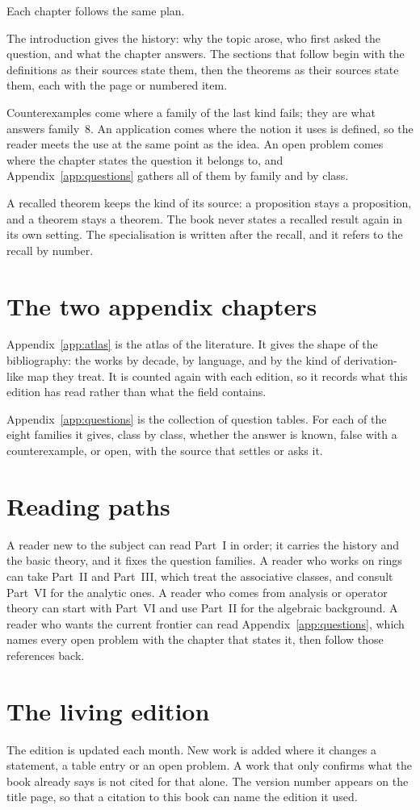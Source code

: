 Each chapter follows the same plan.

The introduction gives the history: why the topic arose, who first asked the
question, and what the chapter answers.
The sections that follow begin with the definitions as their sources state them,
then the theorems as their sources state them, each with the page or numbered
item.

Counterexamples come where a family of the last kind fails; they are what
answers family~8.
An application comes where the notion it uses is defined, so the reader meets
the use at the same point as the idea.
An open problem comes where the chapter states the question it belongs to,
and Appendix~\ref{app:questions} gathers all of them by family and by class.

A recalled theorem keeps the kind of its source: a proposition stays a
proposition, and a theorem stays a theorem.
The book never states a recalled result again in its own setting.
The specialisation is written after the recall, and it refers to the recall by
number.

\section*{The two appendix chapters}

Appendix~\ref{app:atlas} is the atlas of the literature.
It gives the shape of the bibliography: the works by decade, by language, and by
the kind of derivation-like map they treat.
It is counted again with each edition, so it records what this edition has read
rather than what the field contains.

Appendix~\ref{app:questions} is the collection of question tables.
For each of the eight families it gives, class by class, whether the answer is
known, false with a counterexample, or open, with the source that settles or
asks it.

\section*{Reading paths}

A reader new to the subject can read Part~I in order; it carries the history and
the basic theory, and it fixes the question families.
A reader who works on rings can take Part~II and Part~III, which treat the
associative classes, and consult Part~VI for the analytic ones.
A reader who comes from analysis or operator theory can start with Part~VI and
use Part~II for the algebraic background.
A reader who wants the current frontier can read
Appendix~\ref{app:questions}, which names every open problem with the chapter
that states it, then follow those references back.

\section*{The living edition}

The edition is updated each month.
New work is added where it changes a statement, a table entry or an open
problem.
A work that only confirms what the book already says is not cited for that
alone.
The version number appears on the title page, so that a citation to this book
can name the edition it used.
